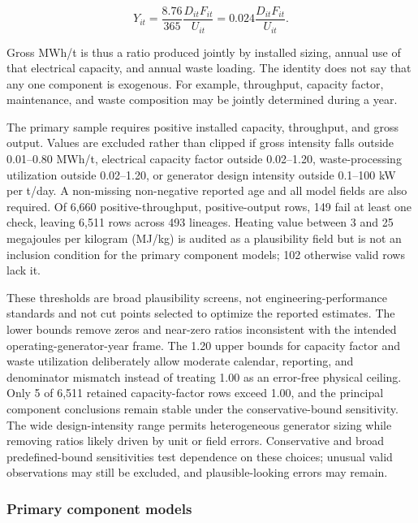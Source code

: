 \documentclass[12pt,letterpaper]{article}
\begin{document}
\begin{equation}
Y_{it}=\frac{8.76}{365}\frac{D_{it}F_{it}}{U_{it}}
=0.024\frac{D_{it}F_{it}}{U_{it}}.
\label{eq:engineering-identity}
\end{equation}

Gross MWh/t is thus a ratio produced jointly by installed sizing, annual use of
that electrical capacity, and annual waste loading. The identity does not say
that any one component is exogenous. For example, throughput, capacity factor,
maintenance, and waste composition may be jointly determined during a year.

The primary sample requires positive installed capacity, throughput, and gross
output. Values are excluded rather than clipped if gross intensity falls
outside 0.01--0.80 MWh/t, electrical capacity factor outside 0.02--1.20,
waste-processing utilization outside 0.02--1.20, or generator design intensity
outside 0.1--100 kW per t/day. A non-missing non-negative reported age and all
model fields are also required. Of 6,660 positive-throughput, positive-output
rows, 149 fail at least one check, leaving 6,511 rows across 493 lineages.
Heating value between 3 and 25 megajoules per kilogram (MJ/kg) is audited as a
plausibility field but is not an inclusion condition for the primary component
models; 102 otherwise valid rows lack it.

These thresholds are broad plausibility screens, not engineering-performance
standards and not cut points selected to optimize the reported estimates. The
lower bounds remove zeros and near-zero ratios inconsistent with the intended
operating-generator-year frame. The 1.20 upper bounds for capacity factor and
waste utilization deliberately allow moderate calendar, reporting, and
denominator mismatch instead of treating 1.00 as an error-free physical ceiling.
Only 5 of 6,511 retained capacity-factor rows exceed 1.00, and the principal
component conclusions remain stable under the conservative-bound sensitivity.
The wide design-intensity range permits heterogeneous generator sizing while
removing ratios likely driven by unit or field errors. Conservative and broad
predefined-bound sensitivities test dependence on these choices; unusual valid
observations may still be excluded, and plausible-looking errors may remain.

\subsubsection{Primary component models}
\end{document}
